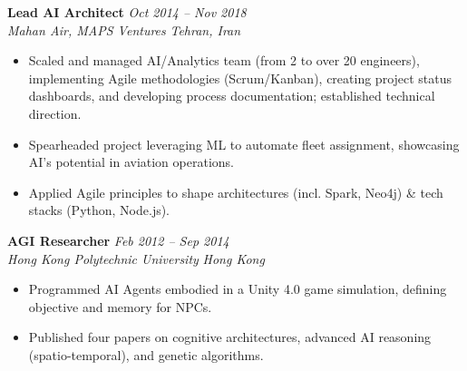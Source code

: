 \documentclass[10pt, a4paper]{article} %
\begin{document}
\vspace{3pt} %
\noindent\textbf{Lead AI Architect} \hfill \small\textit{Oct 2014 – Nov 2018} \\
\noindent\textit{Mahan Air, MAPS Ventures} \hfill \small\textit{Tehran, Iran}
\vspace{1pt}
\begin{itemize}[label=\tiny\textbullet]
    \item Scaled and managed AI/Analytics team (from 2 to over 20 engineers), implementing Agile methodologies (Scrum/Kanban), creating project status dashboards, and developing process documentation; established technical direction.
    \item Spearheaded project leveraging ML to automate fleet assignment, showcasing AI's potential in aviation operations.
    \item Applied Agile principles to shape architectures (incl. Spark, Neo4j) \& tech stacks (Python, Node.js).
\end{itemize}

\vspace{3pt} %
\noindent\textbf{AGI Researcher} \hfill \small\textit{Feb 2012 – Sep 2014} \\
\noindent\textit{Hong Kong Polytechnic University} \hfill \small\textit{Hong Kong}
\vspace{1pt}
\begin{itemize}[label=\tiny\textbullet]
    \item Programmed AI Agents embodied in a Unity 4.0 game simulation, defining objective and memory for NPCs.
    \item Published four papers on cognitive architectures, advanced AI reasoning (spatio-temporal), and genetic algorithms.
\end{itemize}
\vspace{3pt} %
\end{document}
